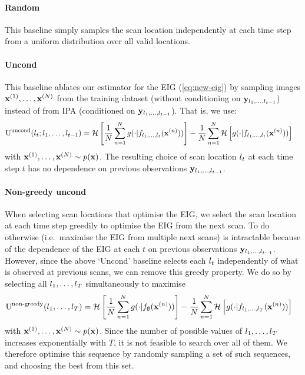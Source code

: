 \paragraph{Random}
This baseline simply samples the scan location independently at each time step
from a uniform distribution over all valid locations.

\paragraph{Uncond}
This baseline ablates our estimator for the EIG (\cref{eq:new-eig}) by sampling
images ${\mathbf{x}}^{(1)},\ldots,{\mathbf{x}}^{(N)}$ from the training dataset (without
conditioning on ${\mathbf{y}}_{l{}_1,\ldots,l{}_{t-1}}$) instead of from IPA
(conditioned on ${\mathbf{y}}_{l{}_1,\ldots,l{}_{t-1}}$). That is, we use:
\begin{align}
  \label{eq:uncond}
  \text{U}^{\text{uncond}}(l{}_t; l{}_1,&\ldots,l{}_{t-1}) = \mathcal{H} \left[ \frac{1}{N} \sum_{n=1}^N g(\cdot|f_{l{}_1,\ldots,l{}_t}({\mathbf{x}}^{(n)})) \right] - \frac{1}{N} \sum_{n=1}^N  \mathcal{H} \left[ g(\cdot|f_{l{}_1,\ldots,l{}_t}({\mathbf{x}}^{(n)})) \right]
\end{align}
with ${\mathbf{x}}^{(1)},\ldots,{\mathbf{x}}^{(N)} \sim p({\mathbf{x}})$. The resulting choice of scan
location $l{}_t$ at each time step $t$ has no dependence on previous
observations ${\mathbf{y}}_{l{}_1,\ldots,l{}_{t-1}}$.

\paragraph{Non-greedy uncond}
When selecting scan locations that optimise the EIG, we select the scan location
at each time step greedily to optimise the EIG from the next scan. To do
otherwise (i.e.~maximise the EIG from multiple next scans) is intractable
because of the dependence of the EIG at each $t$ on previous observations
${\mathbf{y}}_{l{}_1,\ldots,l{}_{t-1}}$. However, since the above `Uncond' baseline
selects each $l{}_t$ independently of what is observed at previous scans, we can
remove this greedy property. We do so by selecting all $l{}_1,\ldots,l{}_T$
simultaneously to maximise
\begin{align}
  \text{U}^{\text{non-greedy}}(l{}_1,&\ldots,l{}_T) = \mathcal{H} \left[ \frac{1}{N} \sum_{n=1}^N g(\cdot|f_{\emptyset}({\mathbf{x}}^{(n)})) \right] - \frac{1}{N} \sum_{n=1}^N  \mathcal{H} \left[ g(\cdot|f_{l{}_1,\ldots,l{}_T}({\mathbf{x}}^{(n)})) \right]
\end{align}
with ${\mathbf{x}}^{(1)},\ldots,{\mathbf{x}}^{(N)} \sim p({\mathbf{x}})$. Since the number of possible
values of $l{}_1,\ldots,l{}_T$ increases exponentially with $T$, it is not feasible
to search over all of them. We therefore optimise this sequence by
randomly sampling a set of such sequences, and choosing the best from this set.


